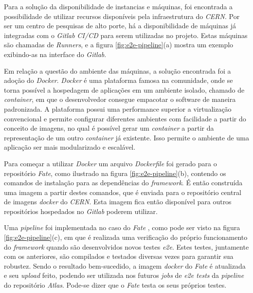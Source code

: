 Para a solução da disponibilidade de instancias e máquinas, foi encontrada a possibilidade de utilizar recursos disponíveis pela infraestrutura do \emph{CERN}. Por ser um centro de pesquisas de alto porte, há a disponibilidade de máquinas já integradas com o \emph{Gitlab CI/CD} para serem utilizadas no projeto. Estas máquinas são chamadas de \emph{Runners}, e a figura \ref{fig:e2e-pipeline}(a) mostra um exemplo exibindo-as na interface do \emph{Gitlab}.

Em relação a questão do ambiente das máquinas, a solução encontrada foi a adoção do \emph{Docker}. \emph{Docker} é uma plataforma famosa na comunidade, onde se torna possível a hospedagem de aplicações em um ambiente isolado, chamado de \emph{container}, em que o desenvolvedor consegue empacotar o software de maneira padronizada. A plataforma possui uma performance superior a virtualização convencional e permite configurar diferentes ambientes com facilidade a partir do conceito de imagens, no qual é possível gerar um \emph{container} a partir da representação de um outro \emph{container} já existente. Isso permite o ambiente de uma aplicação ser mais modularizado e escalável.

Para começar a utilizar \emph{Docker} um arquivo \emph{Dockerfile} foi gerado para o repositório \emph{Fate}, como ilustrado na figura \ref{fig:e2e-pipeline}(b), contendo os comandos de instalação para as dependências do \emph{framework}. É então construída uma imagem a partir destes comandos, que é enviada para o repositório central de imagens \emph{docker} do \emph{CERN}. Esta imagem fica então disponível para outros repositórios hospedados no \emph{Gitlab} poderem utilizar.

Uma \emph{pipeline} foi implementada no caso do \emph{Fate} , como pode ser visto na figura \ref{fig:e2e-pipeline}(c), em que é realizada uma verificação do próprio funcionamento do \emph{framework} quando são desenvolvidos novos testes \emph{e2e}. Estes testes, juntamente com os anteriores, são compilados e testados diversas vezes para garantir sua robustez. Sendo o resultado bem-sucedido, a imagem \emph{docker} do \emph{Fate} é atualizada e seu \emph{upload} feito, podendo ser utilizada nos futuros \emph{jobs} de \emph{e2e tests} da \emph{pipeline} do repositório \emph{Atlas}. Pode-se dizer que o \emph{Fate} testa os seus próprios testes.

